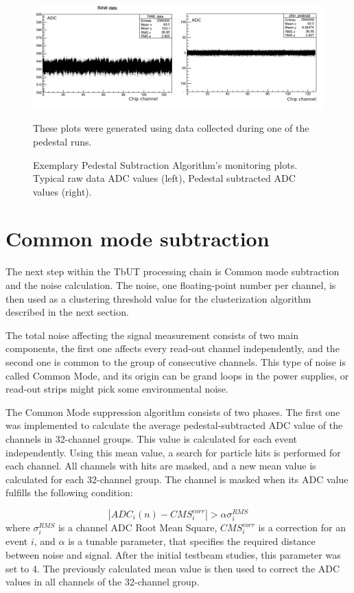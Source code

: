 \begin{figure}[h]
\centering
\includegraphics{figures/Pedestal_vs_raw.png}
\caption{Exemplary Pedestal Subtraction Algorithm's monitoring plots. Typical raw data ADC values (left), Pedestal subtracted ADC values
(right).} These plots were generated using data collected during one of the pedestal runs. 
\label{fig:raw vs ped}
\end{figure}


\section{Common mode subtraction}
The next step within the TbUT processing chain is Common mode subtraction and the noise calculation. The noise, one floating-point number per channel,  is then used as a clustering threshold value for the clusterization algorithm described in the next section. 


The total noise affecting the signal measurement consists of two main components,  the first one affects every read-out channel independently, and the second one is common to the group of consecutive channels.  This type of noise is called Common Mode, and its origin can be grand loops in the power supplies, or read-out strips might pick some environmental noise. 

The Common Mode suppression algorithm consists of two phases. The first one was implemented to calculate the average pedestal-subtracted ADC value of the channels in 32-channel groups. This value is calculated for each event independently. Using this mean value, a search for particle hits is performed for each channel. All channels with hits are masked, and a new mean value is calculated for each 32-channel group. The channel is masked when its ADC value fulfills the following condition:

\begin{equation}
    |ADC_{i}(n)-CMS^{corr}_{i}| > \alpha \sigma^{RMS}_{i}
\end{equation}
where $\sigma^{RMS}_{i}$ is a channel ADC Root Mean Square, $CMS^{corr}_{i} $ is a correction for an event $i$, and $\alpha$ is a tunable parameter, that specifies the required distance between noise and signal. After the initial testbeam studies, this parameter was set to 4. 
The previously calculated mean value is then used to correct the ADC values in all channels of the 32-channel group.

